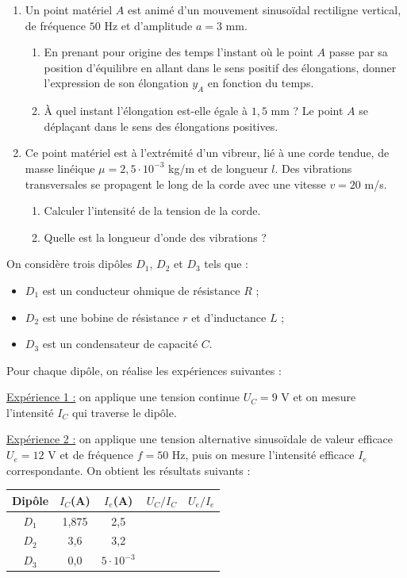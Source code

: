 \documentclass[11pt]{article}
\begin{document}
\begin{enumerate}
  \item Un point matériel $A$ est animé d'un mouvement sinusoïdal rectiligne vertical, de fréquence $50$ Hz et d'amplitude $a = 3$ mm.
  \begin{enumerate}[label=\alph*.]
    \item En prenant pour origine des temps l'instant où le point $A$ passe par sa position d'équilibre en allant dans le sens positif des élongations, donner l'expression de son élongation $y_A$ en fonction du temps.
    \item À quel instant l'élongation est-elle égale à $1{,}5$ mm ? Le point $A$ se déplaçant dans le sens des élongations positives.
  \end{enumerate}
  \item Ce point matériel est à l'extrémité d'un vibreur, lié à une corde tendue, de masse linéique $\mu = 2{,}5\cdot10^{-3}$ kg/m et de longueur $l$. Des vibrations transversales se propagent le long de la corde avec une vitesse $v = 20$ m/s.
  \begin{enumerate}[label=\alph*.]
    \item Calculer l'intensité de la tension de la corde.
    \item Quelle est la longueur d'onde des vibrations ?
  \end{enumerate}
\end{enumerate}

On considère trois dipôles $D_1$, $D_2$ et $D_3$ tels que :
\begin{itemize}
  \item $D_1$ est un conducteur ohmique de résistance $R$ ;
  \item $D_2$ est une bobine de résistance $r$ et d'inductance $L$ ;
  \item $D_3$ est un condensateur de capacité $C$.
\end{itemize}
Pour chaque dipôle, on réalise les expériences suivantes :

\underline{Expérience 1 :} on applique une tension continue $U_C = 9$ V et on mesure l'intensité $I_C$ qui traverse le dipôle.

\underline{Expérience 2 :} on applique une tension alternative sinusoïdale de valeur efficace $U_e = 12$ V et de fréquence $f = 50$ Hz, puis on mesure l'intensité efficace $I_e$ correspondante. On obtient les résultats suivants :

\begin{center}\renewcommand{\arraystretch}{1.4}
\begin{tabular}{|c|c|c|c|c|}
\hline
Dipôle & $I_C$(A) & $I_e$(A) & $U_C/I_C$ & $U_e/I_e$ \\
\hline
$D_1$ & 1,875 & 2,5 & & \\
\hline
$D_2$ & 3,6 & 3,2 & & \\
\hline
$D_3$ & 0,0 & $5\cdot10^{-3}$ & & \\
\hline
\end{tabular}
\end{center}
\end{document}
